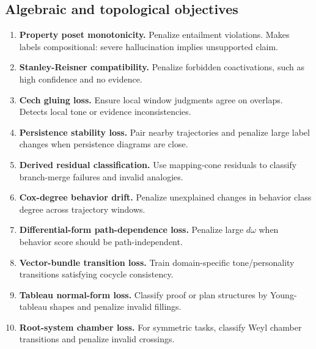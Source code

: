 \documentclass[11pt]{article}
\numberwithin{equation}{section}
\begin{document}
\subsection{Algebraic and topological objectives}
\begin{enumerate}[resume]
\item \textbf{Property poset monotonicity.} Penalize entailment violations. Makes labels compositional: severe hallucination implies unsupported claim.
\item \textbf{Stanley-Reisner compatibility.} Penalize forbidden coactivations, such as high confidence and no evidence.
\item \textbf{Cech gluing loss.} Ensure local window judgments agree on overlaps. Detects local tone or evidence inconsistencies.
\item \textbf{Persistence stability loss.} Pair nearby trajectories and penalize large label changes when persistence diagrams are close.
\item \textbf{Derived residual classification.} Use mapping-cone residuals to classify branch-merge failures and invalid analogies.
\item \textbf{Cox-degree behavior drift.} Penalize unexplained changes in behavior class degree across trajectory windows.
\item \textbf{Differential-form path-dependence loss.} Penalize large $d\omega$ when behavior score should be path-independent.
\item \textbf{Vector-bundle transition loss.} Train domain-specific tone/personality transitions satisfying cocycle consistency.
\item \textbf{Tableau normal-form loss.} Classify proof or plan structures by Young-tableau shapes and penalize invalid fillings.
\item \textbf{Root-system chamber loss.} For symmetric tasks, classify Weyl chamber transitions and penalize invalid crossings.
\end{enumerate}
\end{document}
